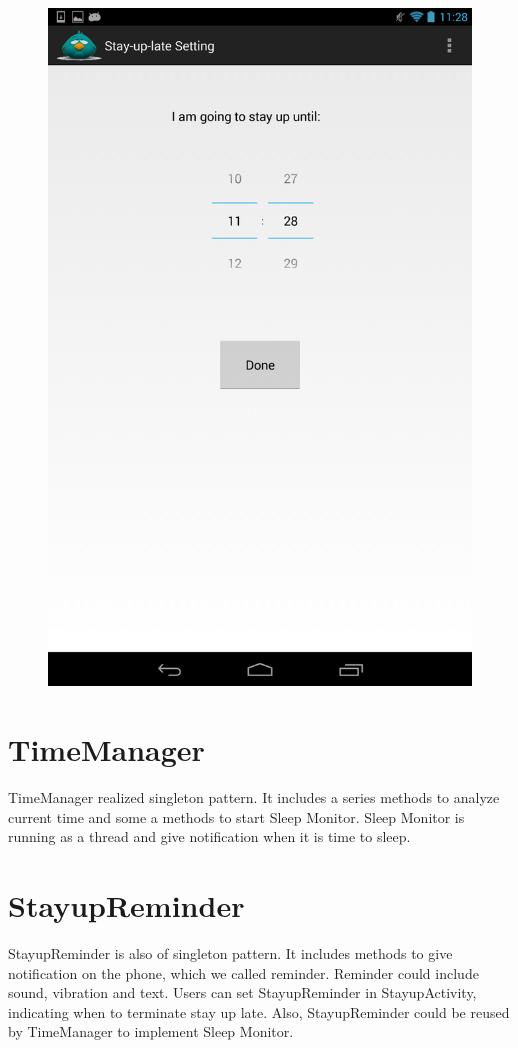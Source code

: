 \documentclass[14pt]{extreport}
\begin{document}
\begin{figure}[h]
\begin{center}
\includegraphics[width=5in]{stayuplate_setting}
\end{center}
\end{figure}

\section{TimeManager}
TimeManager realized singleton pattern. It includes a series methods to analyze current time and some a methods to start Sleep Monitor. Sleep Monitor is running as a thread and give notification when it is time to sleep.

\section{StayupReminder}
StayupReminder is also of singleton pattern. It includes methods to give notification on the phone, which we called reminder. Reminder could include sound, vibration and text. Users can set StayupReminder in StayupActivity, indicating when to terminate stay up late. Also, StayupReminder could be reused by TimeManager to implement Sleep Monitor.
\end{document}
